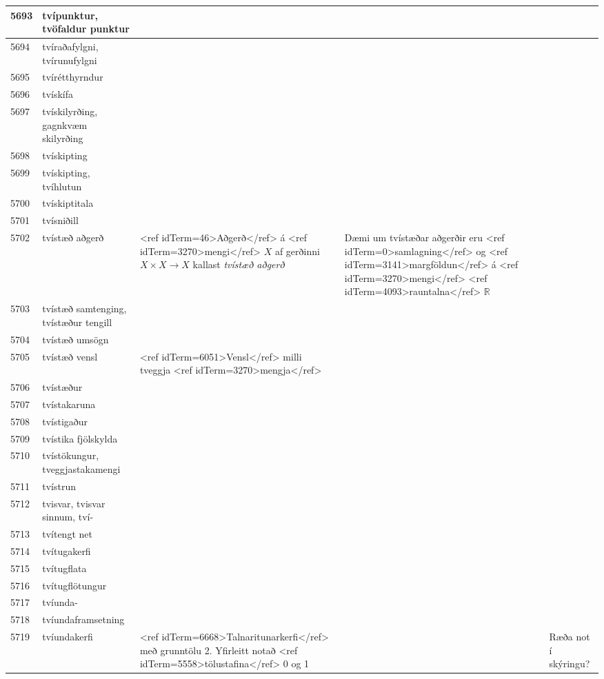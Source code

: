 \begin{longtable}{p{}|p{}|p{}|p{}|p{}}
\hline
5693 & tvípunktur, tvöfaldur punktur &  &  &  \\
\hline
5694 & tvíraðafylgni, tvírunufylgni &  &  &  \\
\hline
5695 & tvírétthyrndur &  &  &  \\
\hline
5696 & tvískífa &  &  &  \\
\hline
5697 & tvískilyrðing, gagnkvæm skilyrðing &  &  &  \\
\hline
5698 & tvískipting &  &  &  \\
\hline
5699 & tvískipting, tvíhlutun &  &  &  \\
\hline
5700 & tvískiptitala &  &  &  \\
\hline
5701 & tvísniðill &  &  &  \\
\hline
5702 & tvístæð aðgerð & <ref idTerm=46>Aðgerð</ref> á <ref idTerm=3270>mengi</ref> $X$ af gerðinni $X \times X \to X$ kallast \textit{tvístæð aðgerð} & Dæmi um tvístæðar aðgerðir eru <ref idTerm=0>samlagning</ref> og <ref idTerm=3141>margföldun</ref> á <ref idTerm=3270>mengi</ref> <ref idTerm=4093>rauntalna</ref> $\mathbb{R}$ &  \\
\hline
5703 & tvístæð samtenging, tvístæður tengill &  &  &  \\
\hline
5704 & tvístæð umsögn &  &  &  \\
\hline
5705 & tvístæð vensl & <ref idTerm=6051>Vensl</ref> milli tveggja <ref idTerm=3270>mengja</ref> &  & \\
\hline
5706 & tvístæður &  &  &  \\
\hline
5707 & tvístakaruna &  &  &  \\
\hline
5708 & tvístigaður &  &  &  \\
\hline
5709 & tvístika fjölskylda &  &  &  \\
\hline
5710 & tvístökungur, tveggjastakamengi &  &  &  \\
\hline
5711 & tvístrun &  &  &  \\
\hline
5712 & tvisvar, tvisvar sinnum, tví- &  &  &  \\
\hline
5713 & tvítengt net &  &  &  \\
\hline
5714 & tvítugakerfi &  &  &  \\
\hline
5715 & tvítugflata &  &  &  \\
\hline
5716 & tvítugflötungur &  &  &  \\
\hline
5717 & tvíunda- &  &  &  \\
\hline
5718 & tvíundaframsetning &  &  &  \\
\hline
5719 & tvíundakerfi & <ref idTerm=6668>Talnaritunarkerfi</ref> með grunntölu 2. Yfirleitt notað <ref idTerm=5558>tölustafina</ref> 0 og 1 &  & Ræða not í skýringu? \\

\end{longtable}
